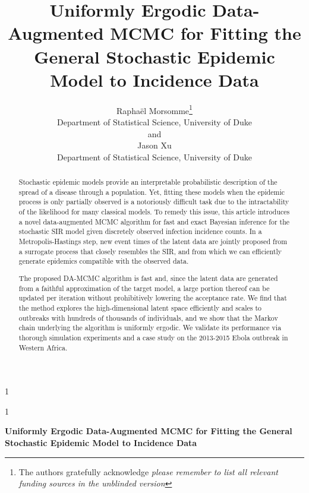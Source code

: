 \documentclass[12pt]{article}
\newcommand{\blind}{1}
\begin{document}
	
	
	\def\spacingset#1{\renewcommand{\baselinestretch}%
		{#1}\small\normalsize} \spacingset{1}
	
	
	
	\blind
	{
		\title{\bf Uniformly Ergodic Data-Augmented MCMC for Fitting the General Stochastic Epidemic Model to Incidence Data}
		\author{Rapha\"{e}l Morsomme\thanks{
				The authors gratefully acknowledge \textit{please remember to list all relevant funding sources in the unblinded version}}\hspace{.2cm}\\
			Department of Statistical Science, University of Duke\\
			and \\
			Jason Xu \\
			Department of Statistical Science, University of Duke}
		\maketitle
	} \fi
	
	\blind
	{
		\bigskip
		\bigskip
		\bigskip
		\begin{center}
			{\LARGE\bf Uniformly Ergodic Data-Augmented MCMC for Fitting the General Stochastic Epidemic Model to Incidence Data}
		\end{center}
		\medskip
	} \fi
	
	\bigskip
	\begin{abstract}
		Stochastic epidemic models provide an interpretable probabilistic description of the spread of a disease through a population. Yet, fitting these models when the epidemic process is only partially observed is a notoriously difficult task due to the intractability of the likelihood for many classical models. To remedy this issue, this article introduces a novel data-augmented MCMC algorithm for fast and exact Bayesian inference for the stochastic SIR model given discretely observed infection incidence counts. In a Metropolis-Hastings step, new event times of the latent data are jointly proposed from a surrogate process that closely resembles the SIR, and from which we can efficiently generate epidemics compatible with the observed data. 
		
		The proposed DA-MCMC algorithm is fast and, since the latent data are generated from a faithful approximation of the target model, a large portion thereof can be updated per iteration without prohibitively lowering the acceptance rate. We find that the method explores the high-dimensional latent space efficiently and scales to outbreaks with hundreds of thousands of individuals, and we show that the Markov chain underlying the algorithm is uniformly ergodic. We validate its performance via thorough simulation experiments and a case study on the 2013-2015 Ebola outbreak in Western Africa.
	\end{abstract}
	
\end{document}
